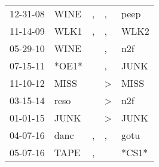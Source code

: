 \begin{supertabular}{p{0.07\textwidth}p{0.06\textwidth}p{0.02\textwidth}p{0.02\textwidth}p{0.06\textwidth}}
 12-31-08\textsuperscript{} &  WINE\textsuperscript{} &  , &             , &  peep\textsuperscript{} \\
 11-14-09\textsuperscript{} &  WLK1\textsuperscript{} &  , &             , &  WLK2\textsuperscript{} \\
 05-29-10\textsuperscript{} &  WINE\textsuperscript{} &    &             , &   n2f\textsuperscript{} \\
 07-15-11\textsuperscript{} &                   *OE1* &    &             , &  JUNK\textsuperscript{} \\
 11-10-12\textsuperscript{} &  MISS\textsuperscript{} &    &  \textgreater &  MISS\textsuperscript{} \\
 03-15-14\textsuperscript{} &  reso\textsuperscript{} &    &  \textgreater &   n2f\textsuperscript{} \\
 01-01-15\textsuperscript{} &  JUNK\textsuperscript{} &    &  \textgreater &  JUNK\textsuperscript{} \\
 04-07-16\textsuperscript{} &  danc\textsuperscript{} &  , &             , &  gotu\textsuperscript{} \\
 05-07-16\textsuperscript{} &  TAPE\textsuperscript{} &  , &               &                   *CS1* \\
\end{supertabular}

